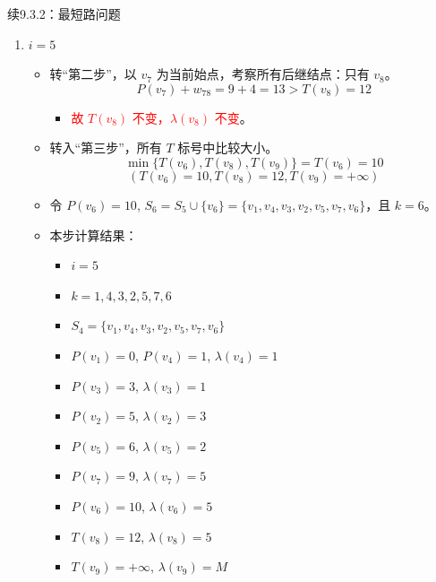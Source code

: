 \begin{exbox}{续9.3.2：最短路问题}{}
\begin{enumerate}[label=(\arabic*)]
\begin{itemize}
\begin{itemize}
					\item \( T(v_8) = 12 \), \( \lambda(v_8) = 5 \)
					\item \( T(v_9) = +\infty \), \( \lambda(v_9) = M \)
				\end{itemize}
			\end{itemize}
			\item \( i = 5 \)
    \begin{itemize}
        \item 转“第二步”，以 \( v_7 \) 为当前始点，考察所有后继结点：只有 \( v_8 \)。
        \[
        P(v_7) + w_{78} = 9 + 4 = 13 > T(v_8) = 12
        \]
        \begin{itemize}
            \item \textcolor{red}{故 \( T(v_8) \) 不变，\( \lambda(v_8) \) 不变}。
        \end{itemize}
        \item 转入“第三步”，所有 \( T \) 标号中比较大小。
        \[
        \min\{T(v_6), T(v_8), T(v_9)\} = T(v_6) = 10
        \]
        \[
        (T(v_6) = 10, T(v_8) = 12, T(v_9) = +\infty)
        \]
        \item 令 \( P(v_6) = 10 \), \( S_6 = S_5 \cup \{v_6\} = \{v_1, v_4, v_3, v_2, v_5, v_7, v_6\} \)，且 \( k = 6 \)。
        \item 本步计算结果：
        \begin{itemize}
            \item \( i = 5 \)
            \item \( k = 1, 4, 3, 2, 5, 7, 6 \)
            \item \( S_4 = \{v_1, v_4, v_3, v_2, v_5, v_7, v_6\} \)
            \item \( P(v_1) = 0 \), \( P(v_4) = 1 \), \( \lambda(v_4) = 1 \)
            \item \( P(v_3) = 3 \), \( \lambda(v_3) = 1 \)
            \item \( P(v_2) = 5 \), \( \lambda(v_2) = 3 \)
            \item \( P(v_5) = 6 \), \( \lambda(v_5) = 2 \)
            \item \( P(v_7) = 9 \), \( \lambda(v_7) = 5 \)
            \item \( P(v_6) = 10 \), \( \lambda(v_6) = 5 \)
            \item \( T(v_8) = 12 \), \( \lambda(v_8) = 5 \)
            \item \( T(v_9) = +\infty \), \( \lambda(v_9) = M \)
        \end{itemize}
    \end{itemize}


\end{enumerate}
\end{exbox}
